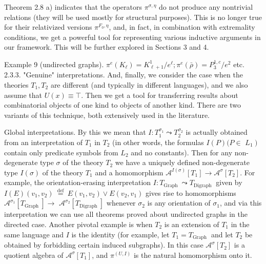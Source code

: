 \documentclass[10pt]{article}
\begin{document}
Theorem 2.8 a) indicates that the operators $\pi^{\sigma, \eta}$ do not produce any nontrivial relations (they will be used mostly for structural purposes). This is no longer true for their relativized versions $\pi^{F_{0}, \eta}$, and, in fact, in combination with extremality conditions, we get a powerful tool for representing various inductive arguments in our framework. This will be further explored in Sections 3 and 4.

Example 9 (undirected graphs). $\pi^{e}\left(K_{\ell}\right)=K_{\ell+1}^{1} / e^{\ell} ; \pi^{e}(\bar{\rho})=P_{3}^{1, c} / e^{2}$ etc.\\
2.3.3. "Genuine" interpretations. And, finally, we consider the case when the theories $T_{1}, T_{2}$ are different (and typically in different languages), and we also assume that $U(x) \equiv \top$. Then we get a tool for transferring results about combinatorial objects of one kind to objects of another kind. There are two variants of this technique, both extensively used in the literature.

Global interpretations. By this we mean that $I: T_{1}^{\sigma_{1}} \leadsto T_{2}^{\sigma_{2}}$ is actually obtained from an interpretation of $T_{1}$ in $T_{2}$ (in other words, the formulas $I(P)(P \in$ $\left.L_{1}\right)$ contain only predicate symbols from $L_{2}$ and no constants). Then for any non-degenerate type $\sigma$ of the theory $T_{2}$ we have a uniquely defined non-degenerate\\
type $I(\sigma)$ of the theory $T_{1}$ and a homomorphism $\mathcal{A}^{I(\sigma)}\left[T_{1}\right] \longrightarrow \mathcal{A}^{\sigma}\left[T_{2}\right]$. For example, the orientation-erasing interpretation $I: T_{\text {Graph }} \leadsto T_{\text {Digraph }}$ given by $I(E)\left(v_{1}, v_{2}\right) \stackrel{\text { def }}{=} E\left(v_{1}, v_{2}\right) \vee E\left(v_{2}, v_{1}\right)$ gives rise to homomorphisms $\mathcal{A}^{\sigma_{1}}\left[T_{\text {Graph }}\right] \longrightarrow$ $\mathcal{A}^{\sigma_{2}}\left[T_{\text {Digraph }}\right]$ whenever $\sigma_{2}$ is any orientation of $\sigma_{1}$, and via this interpretation we can use all theorems proved about undirected graphs in the directed case. Another pivotal example is when $T_{2}$ is an extension of $T_{1}$ in the same language and $I$ is the identity (for example, let $T_{1}=T_{\text {Graph }}$ and let $T_{2}$ be obtained by forbidding certain induced subgraphs). In this case $\mathcal{A}^{\sigma}\left[T_{2}\right]$ is a quotient algebra of $\mathcal{A}^{\sigma}\left[T_{1}\right]$, and $\pi^{(U, I)}$ is the natural homomorphism onto it.
\end{document}
